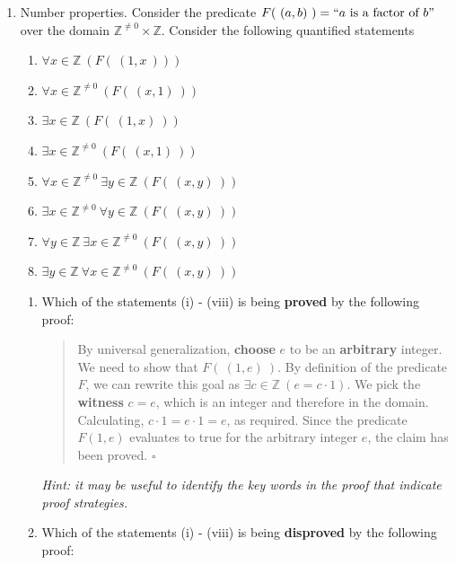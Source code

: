 \begin{enumerate}[labelindent=0pt, leftmargin=0pt]
    
    \item Number properties. Consider the predicate  $F(~(a,b)~)  = ``a \text{ is a factor of } b"$ 
    over  the domain $\mathbb{Z}^{\neq 0} \times \mathbb{Z}$. Consider the following quantified
    statements
    \begin{multicols}{2}
    \begin{enumerate}[label=(\roman*)]
    \item $\forall x \in \mathbb{Z} ~(F(~(1,x~)))$
    \item $\forall x \in \mathbb{Z}^{\neq 0} ~(F(~(x,1)~))$
    \item $\exists x \in \mathbb{Z} ~(F(~(1,x)~))$
    \item $\exists x \in \mathbb{Z}^{\neq 0} ~(F(~(x,1)~))$
    \item $\forall x \in \mathbb{Z}^{\neq 0} ~\exists y \in \mathbb{Z} ~(F(~(x,y)~))$
    \item $\exists x \in \mathbb{Z}^{\neq 0} ~\forall y \in \mathbb{Z} ~(F(~(x,y)~))$
    \item $\forall y \in \mathbb{Z} ~\exists x \in \mathbb{Z}^{\neq 0} ~(F(~(x,y)~))$
    \item $\exists y \in \mathbb{Z} ~\forall x \in \mathbb{Z}^{\neq 0} ~(F(~(x,y)~))$
    \end{enumerate}
    \end{multicols}
    
    \begin{enumerate}
    
    \item\gradeComplete
    Which of the statements (i) - (viii) is being {\bf proved} by the following proof:
    
    \begin{quote}
      By universal generalization, {\bf choose} $e$ to be an {\bf arbitrary} integer. 
      We need to show that $F(~(1,e)~)$. By definition of the  predicate $F$, we can rewrite 
      this goal as $\exists c \in \mathbb{Z}~(e = c \cdot 1)$. We pick the {\bf witness} $c = e$, 
      which is an integer and therefore in the domain. Calculating, 
      $c \cdot 1 = e \cdot 1 = e$, as required. Since the predicate $F(1,e)$ evaluates to true 
      for the arbitrary integer $e$, the claim has been proved. $\square$
    \end{quote}
    
    
    {\it Hint: it may be useful to 
    identify the key words in the proof that indicate proof strategies.}
    
    \item\gradeComplete
    Which of the statements (i) - (viii) is being {\bf disproved} by the following proof:
    

\end{enumerate}
\end{enumerate}
